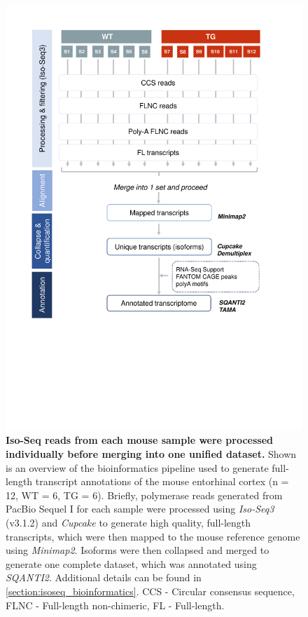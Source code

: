 \begin{figure}[htp]
	\centering
	\vspace{20pt}
	\includegraphics[page=1,trim={0 7cm 2cm 1cm},clip, scale = 0.7]{Figures/WholeTranscriptome_Figures.pdf}
	\captionsetup{width=0.95\textwidth}
	\caption[Detailed Iso-Seq bioinformatics pipeline for global transcriptome profiling]%
	{\textbf{Iso-Seq reads from each mouse sample were processed individually before merging into one unified dataset.} Shown is an overview of the bioinformatics pipeline used to generate full-length transcript annotations of the mouse entorhinal cortex (n = 12, WT = 6, TG = 6). Briefly, polymerase reads generated from PacBio Sequel I for each sample were processed using \textit{Iso-Seq3} (v3.1.2) and \textit{Cupcake} to generate high quality, full-length transcripts, which were then mapped to the mouse reference genome using \textit{Minimap2}. Isoforms were then collapsed and merged to generate one complete dataset, which was annotated using \textit{SQANTI2}. Additional details can be found in \cref{section:isoseq_bioinformatics}. CCS - Circular consensus sequence, FLNC - Full-length non-chimeric, FL - Full-length.}
	\label{fig:isoseq_whole_pipeline}
\end{figure}
 
